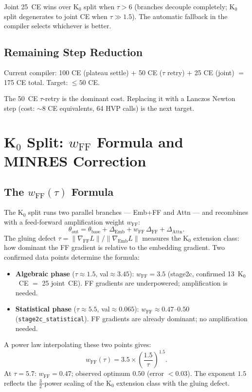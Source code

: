 \documentclass[11pt]{amsart}
\begin{document}
Joint 25~CE wins over K$_0$ split when $\tau > 6$ (branches decouple
completely; K$_0$ split degenerates to joint CE when $\tau \gg 1.5$).
The automatic fallback in the compiler selects whichever is better.

\subsection{Remaining Step Reduction}

Current compiler: 100 CE (plateau settle) $+ $ 50 CE ($\tau$ retry)
$+$ 25 CE (joint) $=$ 175 CE total.
Target: $\leq 50$ CE.

The 50~CE $\tau$-retry is the dominant cost. Replacing it with a
Lanczos Newton step (cost: $\sim$8 CE equivalents, 64 HVP calls)
is the next target.


\section{K\texorpdfstring{$_0$}{0} Split: \texorpdfstring{$w_\mathrm{FF}$}{wFF} Formula and MINRES Correction}
\label{sec:k0_wff}

\subsection{The \texorpdfstring{$w_\mathrm{FF}(\tau)$}{wFF(tau)} Formula}

The K$_0$ split runs two parallel branches --- Emb$+$FF and Attn ---
and recombines with a feed-forward amplification weight $w_\mathrm{FF}$:
\[
  \theta_\mathrm{out} = \theta_\mathrm{base}
    + \Delta_\mathrm{Emb}
    + w_\mathrm{FF}\,\Delta_\mathrm{FF}
    + \Delta_\mathrm{Attn}.
\]
The gluing defect $\tau = \|\nabla_\mathrm{FF} L\| / \|\nabla_\mathrm{Emb} L\|$
measures the K$_0$ extension class: how dominant the FF gradient is relative
to the embedding gradient.
Two confirmed data points determine the formula:
\begin{itemize}
\item \textbf{Algebraic phase} ($\tau \approx 1.5$, val$\approx 3.45$):
  $w_\mathrm{FF} = 3.5$ (stage2c, confirmed 13~K$_0$~CE $=$ 25 joint~CE).
  FF gradients are underpowered; amplification is needed.
\item \textbf{Statistical phase} ($\tau \approx 5.5$, val$\approx 0.065$):
  $w_\mathrm{FF} \approx 0.47$--$0.50$ (\texttt{stage2c\_statistical}).
  FF gradients are already dominant; no amplification needed.
\end{itemize}
A power law interpolating these two points gives:
\begin{equation}
\label{eq:wff}
  w_\mathrm{FF}(\tau) = 3.5 \times \left(\frac{1.5}{\tau}\right)^{1.5}.
\end{equation}
At $\tau=5.7$: $w_\mathrm{FF} = 0.47$; observed optimum $0.50$ (error $< 0.03$).
The exponent $1.5$ reflects the $\frac{3}{2}$-power scaling of the
K$_0$ extension class with the gluing defect.
\end{document}
